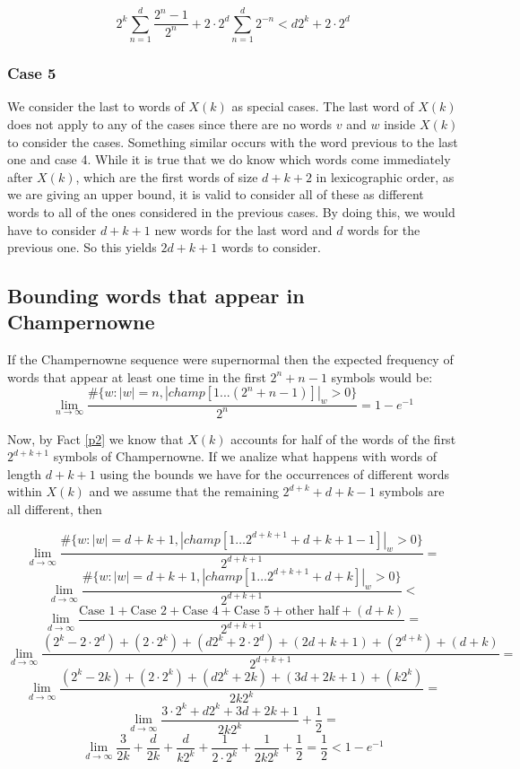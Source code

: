 \documentclass[11pt,a4paper]{tesis}
\theoremstyle{definition}
\begin{document}
$$  2^k \sum_{n=1}^{d} \frac{2^n - 1}{2^n}  + 2 \cdot 2^d \sum_{n=1}^{d} 2^{- n} < d2^k + 2 \cdot 2^d$$

\subsubsection{Case 5}

We consider the last to words of $X(k)$ as special cases. The last word of $X(k)$ does not apply to any of the cases since there are no words $v$ and $w$ inside $X(k)$ to consider the cases. Something similar occurs with the word previous to the last one and case 4. 
While it is true that we do know which words come immediately after  $X(k)$, which are the first words of size $d+k+2$ in lexicographic order, as we are giving an upper bound, it is valid to consider all of these as different words to all of the ones considered in the previous cases.
By doing this, we would have to consider $d+k+1$ new words for the last word and $d$ words for the previous one. So this yields $2d+k+1$ words to consider.


\subsection{Bounding words that appear in Champernowne}

If the Champernowne sequence were supernormal then the expected frequency of words that appear at least one time in the first $2^n + n -1$ symbols would be:
$$\lim_{n\to\infty} \frac{\#\{w: |w| = n  , |champ[1...(2^n+n-1)]|_w > 0\}}{2^n}  = 1 - e^{-1}$$


Now, by Fact \ref{p2} we know that $X(k)$ accounts for half of the words of the first $2^{d+k+1}$ symbols of Champernowne. 
If we analize what happens with words of length $d+k+1$ using the bounds we have for the occurrences of different words within $X(k)$ and we assume that the remaining $2^{d+k} + d + k - 1$  symbols are all different, then



$$\lim_{d\to\infty} \frac{\#\{w : |w| = d+k+1, |champ[1 \dots 2^{d+k+1}+d+k+1-1]|_w > 0 \}}{2^{d+k+1}} =$$
$$\lim_{d\to\infty} \frac{\#\{w : |w| = d+k+1, |champ[1 \dots 2^{d+k+1}+d+k]|_w > 0 \}}{2^{d+k+1}} <$$
$$\lim_{d\to\infty} \frac{ \textrm{Case 1} + \textrm{Case 2}+ \textrm{Case 4} + \textrm{Case 5} + \textrm{other half} + (d + k) }{2^{d+k+1}} =$$
$$\lim_{d\to\infty} \frac{(2^k - 2\cdot 2^d) + (2 \cdot 2^k)+ (d2^k + 2 \cdot 2^d) + (2d+k+1) + (2^{d+k}) + (d + k) }{2^{d+k+1}} =$$
$$\lim_{d\to\infty} \frac{(2^k - 2k) + (2 \cdot 2^k)+ (d2^k + 2k) + (3d+2k+1) + (k2^{k})}{2k2^{k}} =$$
$$\lim_{d\to\infty} \frac{3\cdot2^k + d2^k  + 3d+2k+1}{2k2^{k}} + \frac{1}{2} =$$
$$\lim_{d\to\infty} \frac{3}{2k} + \frac{d}{2k} + \frac{d}{k2^{k}} + \frac{1}{2\cdot2^{k}} + \frac{1}{2k2^{k}} + \frac{1}{2} = \frac{1}{2} < 1 - e^{-1}$$
\end{document}
